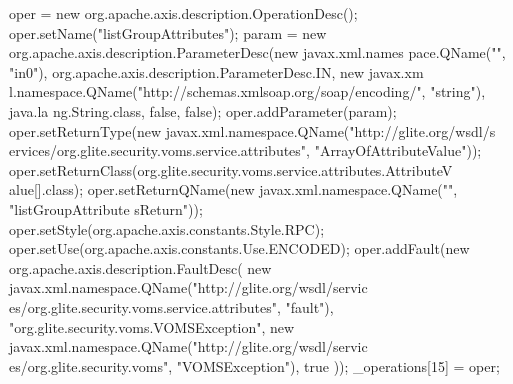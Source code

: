 \begin{DoxyCode}
{        oper = new org.apache.axis.description.OperationDesc();
        oper.setName("listGroupAttributes");
        param = new org.apache.axis.description.ParameterDesc(new javax.xml.names
      pace.QName("", "in0"), org.apache.axis.description.ParameterDesc.IN, new javax.xm
      l.namespace.QName("http://schemas.xmlsoap.org/soap/encoding/", "string"), java.la
      ng.String.class, false, false);
        oper.addParameter(param);
        oper.setReturnType(new javax.xml.namespace.QName("http://glite.org/wsdl/s
      ervices/org.glite.security.voms.service.attributes", "ArrayOfAttributeValue"));
        oper.setReturnClass(org.glite.security.voms.service.attributes.AttributeV
      alue[].class);
        oper.setReturnQName(new javax.xml.namespace.QName("", "listGroupAttribute
      sReturn"));
        oper.setStyle(org.apache.axis.constants.Style.RPC);
        oper.setUse(org.apache.axis.constants.Use.ENCODED);
        oper.addFault(new org.apache.axis.description.FaultDesc(
                      new javax.xml.namespace.QName("http://glite.org/wsdl/servic
      es/org.glite.security.voms.service.attributes", "fault"),
                      "org.glite.security.voms.VOMSException",
                      new javax.xml.namespace.QName("http://glite.org/wsdl/servic
      es/org.glite.security.voms", "VOMSException"), 
                      true
                     ));
        _operations[15] = oper;

}
\end{DoxyCode}
